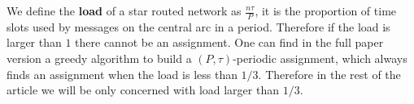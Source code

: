 \documentclass[10pt, conference, letterpaper]{IEEEtran}
\newtheorem{proposition}{Proposition}
\begin{document}
      We define the \textbf{load} of a star routed network as $\frac{n\tau}{P}$, it is the proportion of time slots used by messages on the central arc in a period. Therefore if the load is larger than $1$ there cannot be an assignment. One can find in the full paper version a greedy algorithm to build a $(P,\tau)$-periodic assignment, which always finds an assignment when the load is less than $1/3$. Therefore in the rest of the article we will be only concerned with load larger than $1/3$.
%    
%     
%   
\end{document}
